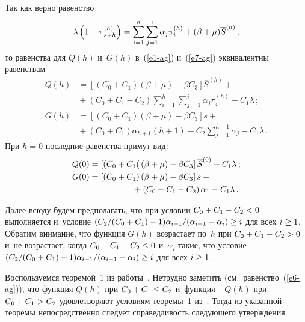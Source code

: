 \begin{multicols}{2}
Так как верно равенство 
$$
\lambda \left(1 - \pi^{(h)}_{s+h}\right) \hm= \sum\limits^h_{i=1} \sum\limits^i_{j=1} 
\alpha_j \pi_i^{(h)} +(\beta+\mu) \overline{S}^{(h)}\,,
$$
то равенства для $Q(h)$ и~$G(h)$ в~(\ref{e1-ag}) и~(\ref{e7-ag}) эквивалентны 
равенствам
\begin{align*}
Q(h) &= \left[ \left( C_0+C_1\right)(\beta+\mu) -\beta C_3\right]\overline{S}^{(h)} 
+{}\\
&{}+\left( C_0 +C_1-C_2\right) \sum\limits^h_{i=1} \sum\limits^i_{j=1} \alpha_j 
\pi_i^{(h)} -C_1\lambda\,;\\
G(h) &= \left[ \left( C_0+C_1\right)(\beta+\mu) -\beta C_3\right]s +{}\\
&{}+\left( 
C_0+C_1\right) \alpha_{h+1} (h+1) -C_2\sum\limits_{j=1}^{h+1} \alpha_j -C_1\lambda\,.
\end{align*}
При $h=0$ последние равенства примут вид:
\begin{align*}
Q(0) &= \left[ \left( C_0+C_1\right((\beta+\mu)-\beta C_3\right] \overline{S}^{(0)} -
C_1\lambda\,;\\
G(0)&= \left[ \left( C_0+C_1\right) (\beta+\mu) -\beta C_3\right] s+{}\\
&\hspace*{18mm}{}+\left( C_0+C_1- C_2\right) \alpha_1 -C_1\lambda\,.
\end{align*}
  
  
  Далее всюду будем предполагать, что при условии $C_0\hm+ C_1\hm- C_2 
\hm<0$ выполняется и~условие $(C_2/(C_0\hm+C_1)-1) 
\alpha_{i+1}/(\alpha_{i+1}\hm-\alpha_i)\hm\geq i$ для всех $i\hm\geq 1$. Обратим 
внимание, что функция $G(h)$ возрастает по~$h$ при $C_0\hm+C_1\hm- C_2\hm 
>0$ и~не возрастает, когда $C_0\hm+C_1\hm- C_2\hm\leq 0$ и~$\alpha_i$ такие, 
что условие $(C_2/(C_0\hm+C_1)-1) \alpha_{i+1}/(\alpha_{i+1}\hm-\alpha_i)\hm\geq 
i$ для всех $i\hm\geq 1$.
  
  Воспользуемся теоремой~1 из работы~\cite{14-ag}. Нетрудно заметить (см.\ 
равенство~(\ref{e6-ag})), что функция $Q(h)$ при $C_0\hm+C_1\hm\leq C_2$ и~функция $-Q(h)$ при $C_0\hm+C_1\hm> C_2$ удовлетворяют условиям 
теоремы~1 из~\cite{14-ag}. Тогда из указанной теоремы непосредственно следует 
справедливость следующего утверж\-де\-ния. 
  
  \smallskip
  

\end{multicols}
